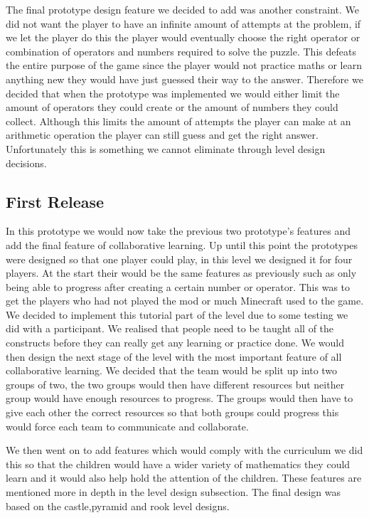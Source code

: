 The final prototype design feature we decided to add was another constraint. We did not want the player to have an infinite amount of attempts at the problem, if we let the player do this the player would eventually choose the right operator or combination of operators and numbers required to solve the puzzle. This defeats the entire purpose of the game since the player would not practice maths or learn anything new they would have just guessed their way to the answer. Therefore we decided that when the prototype was implemented we would either limit the amount of operators they could create or the amount of numbers they could collect. Although this limits the amount of attempts the player can make at an arithmetic operation the player can still guess and get the right answer. Unfortunately this is something we cannot eliminate through level design decisions.

\subsection{First Release}
In this prototype we would now take the previous two prototype's features and add the final feature of collaborative learning. Up until this point the prototypes were designed so that one player could play, in this level we designed it for four players. At the start their would be the same features as previously such as only being able to progress after creating a certain number or operator. This was to get the players who had not played the mod or much Minecraft used to the game. We decided to implement this tutorial part of the level due to some testing we did with a participant. We realised that people need to be taught all of the constructs before they can really get any learning or practice done. We would then design the next stage of the level with the most important feature of all collaborative learning. We decided that the team would be split up into two groups of two, the two groups would then have different resources but neither group would have enough resources to progress. The groups would then have to give each other the correct resources so that both groups could progress this would force each team to communicate and collaborate.

We then went on to add features which would comply with the curriculum we did this so that the children would have a wider variety of mathematics they could learn and it would also help hold the attention of the children. These features are mentioned more in depth in the level design subsection. The final design was based on the castle,pyramid and rook level designs.

